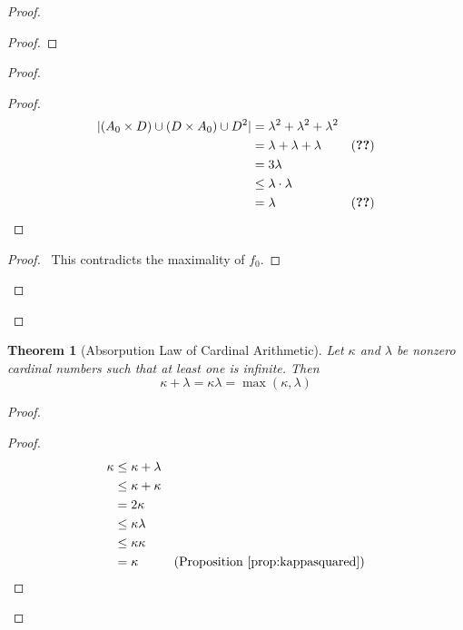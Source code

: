 \documentclass{book}
\let\qed\relax
\newtheorem{thm}[ax]{Theorem}
\theoremstyle{definition}
\begin{document}
\begin{proof}
\begin{proof}
\end{proof}
\begin{proof}
	\begin{proof}
		\pf
		\begin{align*}
			|(A_0 \times D) \cup (D \times A_0) \cup D^2| & = \lambda^2 + \lambda^2 + \lambda^2 \\
			& = \lambda + \lambda + \lambda & (\text{\stepref{9}}) \\
			& = 3 \lambda \\
			& \leq \lambda \cdot \lambda \\
			& = \lambda & (\text{\stepref{9}})
		\end{align*}
	\end{proof}
	\qedstep
	\begin{proof}
		\pf\ This contradicts the maximality of $f_0$.
	\end{proof}
\end{proof}
\qed
\end{proof}

\begin{thm}[Absorpution Law of Cardinal Arithmetic]
Let $\kappa$ and $\lambda$ be nonzero cardinal numbers such that at least one is infinite. Then
\[ \kappa + \lambda = \kappa \lambda = \max(\kappa, \lambda) \]
\end{thm}

\begin{proof}
\pf
{}
\begin{proof}
	\pf
	\begin{align*}
		\kappa & \leq \kappa + \lambda \\
		& \leq \kappa + \kappa \\
		& = 2 \kappa \\
		& \leq \kappa \lambda \\
		& \leq \kappa \kappa \\
		& = \kappa & (\text{Proposition \ref{prop:kappasquared}})
	\end{align*}
\end{proof}
\qed
\end{proof}
\end{document}
